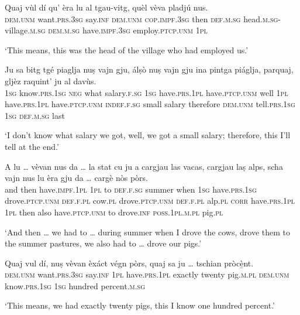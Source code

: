 \begin{linenumbers}
	\gll    Quaj vùl dí qu’ èra lu al tgau-vitg, quèl vèva pladjú nus.\\
	\textsc{dem.unm} want.\textsc{prs.3sg} say.\textsc{inf} \textsc{dem.unm} \textsc{cop.impf.3sg} then \textsc{def.m.sg} head.\textsc{m.sg}-village.\textsc{m.sg} \textsc{dem.m.sg} have.\textsc{impf.3sg} employ.\textsc{ptcp.unm} \textsc{1pl}  \textsc{}  \textsc{}  \textsc{}  \textsc{}  \textsc{} \\
\end{linenumbers}
\medskip
\glt `This means, this was the head of the village who had employed us.'
\medskip

\begin{linenumbers}
	\gll    Ju sa bitg tgé piaglja nuṣ vajn gju, álṣò nuṣ vajn gju ina pintga piáglja, parquaj, gljèz raquint' ju al davùs.\\
	\textsc{1sg} know.\textsc{prs.1sg} \textsc{neg} what  salary.\textsc{f.sg}  \textsc{1sg}  have.\textsc{prs.1pl} have.\textsc{ptcp.unm} well \textsc{1pl} have.\textsc{prs.1pl}  have.\textsc{ptcp.unm} \textsc{indef.f.sg} small salary therefore \textsc{dem.unm} tell.\textsc{prs.1sg} \textsc{1sg} \textsc{def.m.sg} last \\
\end{linenumbers}
\medskip
\glt `I don’t know what salary we got, well, we got a small salary; therefore, this I’ll tell at the end.'
\medskip

\begin{linenumbers}
	\gll    A lu … vèvan nus da … la stat cu ju a cargjau las vacas, cargjau laṣ alps, scha vajn nus lu èra gju da … cargè nòs pòrs.\\
	and then {} have.\textsc{impf.1pl} \textsc{1pl}  to {} \textsc{def.f.sg} summer when  \textsc{1sg} have.\textsc{prs.1sg} drove.\textsc{ptcp.unm} \textsc{def.f.pl} cow.\textsc{pl} drove.\textsc{ptcp.unm} \textsc{def.f.pl} alp.\textsc{pl} \textsc{corr} have.\textsc{prs.1pl} \textsc{1pl} then also have.\textsc{ptcp.unm} to {} drove.\textsc{inf} {} \textsc{poss.1pl.m.pl} pig.\textsc{pl}\\
\end{linenumbers}
\medskip
\glt `And then … we had to … during summer when I drove the cows, drove them to the summer pastures, we also had to … drove our pigs.'
\medskip

\begin{linenumbers}
	\gll    Quaj vul dí, nuṣ vèvan èxáct végn pòrs, quaj sa ju … tschian pròcè̱nt.\\
	\textsc{dem.unm} want.\textsc{prs.3sg} say.\textsc{inf} \textsc{1pl} have.\textsc{prs.1pl} exactly twenty pig.\textsc{m.pl}  \textsc{dem.unm} know.\textsc{prs.1sg} \textsc{1sg} {} hundred percent.\textsc{m.sg}\\
\end{linenumbers}
\medskip
\glt `This means, we had exactly twenty pigs, this I know one hundred percent.'
\medskip

